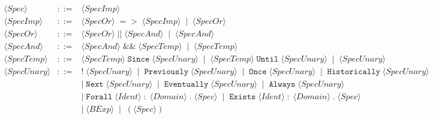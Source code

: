 \documentclass{article}
\begin{document}
\[
\begin{array}{rcl}
\langle \mathit{Spec} \rangle
&::=&
\langle \mathit{SpecImp} \rangle \\[4pt]

\langle \mathit{SpecImp} \rangle
&::=&
\langle \mathit{SpecOr} \rangle\;\mathtt{=>}\;\langle \mathit{SpecImp} \rangle
\;\mid\;
\langle \mathit{SpecOr} \rangle \\[4pt]

\langle \mathit{SpecOr} \rangle
&::=&
\langle \mathit{SpecOr} \rangle\;\mathtt{||}\;\langle \mathit{SpecAnd} \rangle
\;\mid\;
\langle \mathit{SpecAnd} \rangle \\[4pt]

\langle \mathit{SpecAnd} \rangle
&::=&
\langle \mathit{SpecAnd} \rangle\;\mathtt{\&\&}\;\langle \mathit{SpecTemp} \rangle
\;\mid\;
\langle \mathit{SpecTemp} \rangle \\[4pt]

\langle \mathit{SpecTemp} \rangle
&::=&
\langle \mathit{SpecTemp} \rangle\;\mathtt{Since}\;\langle \mathit{SpecUnary} \rangle
\;\mid\;
\langle \mathit{SpecTemp} \rangle\;\mathtt{Until}\;\langle \mathit{SpecUnary} \rangle
\;\mid\;
\langle \mathit{SpecUnary} \rangle \\[4pt]

\langle \mathit{SpecUnary} \rangle
&::=&
\mathtt{!}\;\langle \mathit{SpecUnary} \rangle
\;\mid\;
\mathtt{Previously}\;\langle \mathit{SpecUnary} \rangle
\;\mid\;
\mathtt{Once}\;\langle \mathit{SpecUnary} \rangle
\;\mid\;
\mathtt{Historically}\;\langle \mathit{SpecUnary} \rangle \\[2pt]
&&
\mid\;
\mathtt{Next}\;\langle \mathit{SpecUnary} \rangle
\;\mid\;
\mathtt{Eventually}\;\langle \mathit{SpecUnary} \rangle
\;\mid\;
\mathtt{Always}\;\langle \mathit{SpecUnary} \rangle \\[2pt]
&&
\mid\;
\mathtt{Forall}\;\langle \mathit{Ident} \rangle\; \mathtt{:}\; \langle \mathit{Domain} \rangle\;\texttt{.}\;\langle \mathit{Spec} \rangle
\;\mid\;
\mathtt{Exists}\;\langle \mathit{Ident} \rangle\; \mathtt{:}\; \langle \mathit{Domain} \rangle\;\texttt{.}\;\langle \mathit{Spec} \rangle \\[2pt]
&&
\mid\;
\langle \mathit{BExp} \rangle
\;\mid\;
(\langle \mathit{Spec} \rangle) \\[4pt]


\end{array}\]
\end{document}

